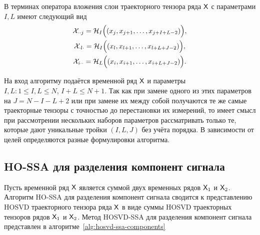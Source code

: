 \documentclass[specialist,
    substylefile = spbu_report.rtx,
    subf,href,colorlinks=true, 12pt]{disser}
\theoremstyle{plain}
\theoremstyle{definition}
\theoremstyle{remark}
\begin{document}
    В терминах оператора вложения слои траекторного тензора ряда $\mathsf{X}$
    с параметрами $I, L$ имеют следующий вид
    \begin{gather*}
        \mathcal{X}_{\cdot \cdot j}= \mathcal{H}_I \Big((x_j, x_{j+1}, \ldots, x_{j+I+L-2})\Big),\\
        \mathcal{X}_{\cdot l \cdot}= \mathcal{H}_I \Big((x_l, x_{l+1}, \ldots, x_{l+L+J-2})\Big),\\
        \mathcal{X}_{i\cdot \cdot}=\mathcal{H}_L \Big((x_i, x_{i+1}, \ldots, x_{i+L+J-2})\Big).\\
    \end{gather*}

    На вход алгоритму подаётся временной ряд $\mathsf{X}$ и параметры $I,L: 1\leqslant I,L \leqslant N,\, I + L \leqslant N + 1$.
    Так как при замене одного из этих параметров на $J=N-I-L+2$ или при замене их между собой получаются
    те же самые траекторные тензоры с точностью до перестановки их измерений, то имеет смысл при
    рассмотрении нескольких наборов параметров рассматривать только те, которые дают уникальные тройки $(I, L, J)$
    без учёта порядка.
    В зависимости от целей определяются разные формулировки алгоритма.
   
   
   \subsection{HO-SSA для разделения компонент сигнала}\label{ho-ssa-sep}
   Пусть временной ряд $\mathsf{X}$ является суммой двух временных рядов $\mathsf{X}_1$ и $\mathsf{X}_2$.
   Алгоритм HO-SSA для разделения компонент сигнала сводится к представлению HOSVD траекторного тензора ряда
   $\mathsf{X}$ в виде суммы HOSVD траекторных тензоров рядов $\mathsf{X}_1$ и $\mathsf{X}_2$.
   Метод HOSVD-SSA для разделения компонент сигнала представлен в алгоритме~\ref{alg:hosvd-ssa-components}
    
\end{document}
